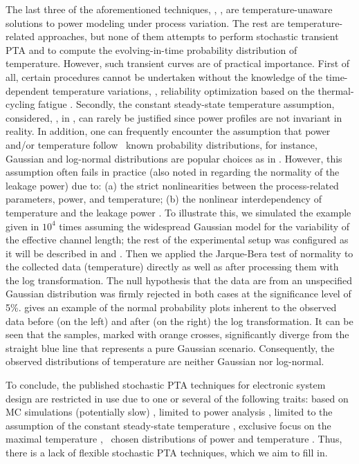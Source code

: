 
The last three of the aforementioned techniques, \ie, \cite{shen2009, bhardwaj2006, ghanta2006}, are temperature-unaware solutions to power modeling under process variation.
The rest are temperature-related approaches, but none of them attempts to perform stochastic transient PTA and to compute the evolving-in-time probability distribution of temperature.
However, such transient curves are of practical importance.
First of all, certain procedures cannot be undertaken without the knowledge of the time-dependent temperature variations, \eg, reliability optimization based on the thermal-cycling fatigue \cite{ukhov2012}.
Secondly, the constant steady-state temperature assumption, considered, \eg, in \cite{juan2011, juan2012}, can rarely be justified since power profiles are not invariant in reality.
In addition, one can frequently encounter the assumption that power and/or temperature follow \apriori\ known probability distributions, for instance, Gaussian and log-normal distributions are popular choices as in \cite{srivastava2010, juan2012, bhardwaj2006}.
However, this assumption often fails in practice (also noted in \cite{juan2012} regarding the normality of the leakage power) due to: (a) the strict nonlinearities between the process-related parameters, power, and temperature; (b) the nonlinear interdependency of temperature and the leakage power \cite{liu2007}.
To illustrate this, we simulated the example given in  $10^4$ times assuming the widespread Gaussian model for the variability of the effective channel length; the rest of the experimental setup was configured as it will be described in  and .
Then we applied the Jarque-Bera test of normality to the collected data (temperature) directly as well as after processing them with the log transformation.
The null hypothesis that the data are from an unspecified Gaussian distribution was firmly rejected in both cases at the significance level of 5\%.
 gives an example of the normal probability plots inherent to the observed data before (on the left) and after (on the right) the log transformation.
It can be seen that the samples, marked with orange crosses, significantly diverge from the straight blue line that represents a pure Gaussian scenario.
Consequently, the observed distributions of temperature are neither Gaussian nor log-normal.

To conclude, the published stochastic PTA techniques for electronic system design are restricted in use due to one or several of the following traits: based on MC simulations (potentially slow) \cite{chandra2010}, limited to power analysis \cite{chandra2010, shen2009, bhardwaj2006, ghanta2006}, limited to the assumption of the constant steady-state temperature \cite{juan2011, juan2012}, exclusive focus on the maximal temperature \cite{juan2011}, \apriori\ chosen distributions of power and temperature \cite{srivastava2010, juan2012, bhardwaj2006}.
Thus, there is a lack of flexible stochastic PTA techniques, which we aim to fill in.
